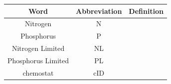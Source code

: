 \documentclass[]{article}
\begin{document}
\begin{longtable}[]{@{}ccc@{}}
\toprule
\begin{minipage}[b]{0.24\columnwidth}\centering\strut
Word
\strut\end{minipage} &
\begin{minipage}[b]{0.19\columnwidth}\centering\strut
Abbreviation
\strut\end{minipage} &
\begin{minipage}[b]{0.15\columnwidth}\centering\strut
Definition
\strut\end{minipage}\tabularnewline
\midrule
\endhead
\begin{minipage}[t]{0.24\columnwidth}\centering\strut
Nitrogen
\strut\end{minipage} &
\begin{minipage}[t]{0.19\columnwidth}\centering\strut
N
\strut\end{minipage} &
\begin{minipage}[t]{0.15\columnwidth}\centering\strut
\strut\end{minipage}\tabularnewline
\begin{minipage}[t]{0.24\columnwidth}\centering\strut
Phosphorus
\strut\end{minipage} &
\begin{minipage}[t]{0.19\columnwidth}\centering\strut
P
\strut\end{minipage} &
\begin{minipage}[t]{0.15\columnwidth}\centering\strut
\strut\end{minipage}\tabularnewline
\begin{minipage}[t]{0.24\columnwidth}\centering\strut
Nitrogen Limited
\strut\end{minipage} &
\begin{minipage}[t]{0.19\columnwidth}\centering\strut
NL
\strut\end{minipage} &
\begin{minipage}[t]{0.15\columnwidth}\centering\strut
\strut\end{minipage}\tabularnewline
\begin{minipage}[t]{0.24\columnwidth}\centering\strut
Phosphorus Limited
\strut\end{minipage} &
\begin{minipage}[t]{0.19\columnwidth}\centering\strut
PL
\strut\end{minipage} &
\begin{minipage}[t]{0.15\columnwidth}\centering\strut
\strut\end{minipage}\tabularnewline
\begin{minipage}[t]{0.24\columnwidth}\centering\strut
chemostat
\strut\end{minipage} &
\begin{minipage}[t]{0.19\columnwidth}\centering\strut
cID
\strut\end{minipage} &
\begin{minipage}[t]{0.15\columnwidth}\centering\strut
\strut\end{minipage}\tabularnewline
\bottomrule
\end{longtable}
\end{document}
